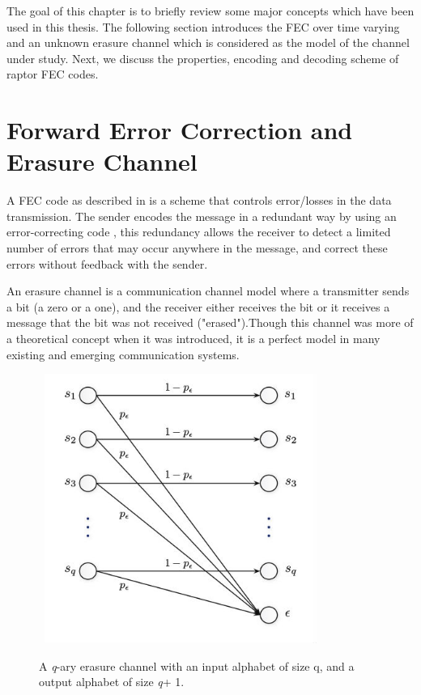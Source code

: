 
\hspace{\parindent} The goal of this chapter is to briefly review some major concepts which have been used in this thesis. The following section introduces the FEC over time varying and an unknown erasure channel which is considered as the model of the channel under study. Next, we discuss the properties, encoding and decoding scheme of raptor FEC codes.
  

\section{Forward Error Correction and Erasure Channel}
A FEC code as described in \cite {griesser2009forward} is a scheme that controls error/losses in the data transmission. The sender encodes the message in a redundant way by using an error-correcting code \cite{macwilliams1977theory} \cite{peterson1972error}, this redundancy allows the receiver to detect a limited number of errors that may occur anywhere in the message, and correct these errors without feedback with the sender. 
\par
An erasure channel is a communication channel model where a transmitter sends a bit (a zero or a one), and the receiver either receives the bit or it receives a message that the bit was not received ("erased").Though this channel was more of a theoretical concept when it was introduced, it is a perfect model in many existing and emerging communication systems.
\begin{figure}[htbp]
\begin{center}
\mbox{
\includegraphics[width=3.5in]{Figures/erasure1}}
\caption{A \textit{q}-ary erasure channel with an input alphabet of size q, and a output alphabet of size \textit{q}+ 1.}
\label{erasure_channel}
\end{center}
\end{figure}

